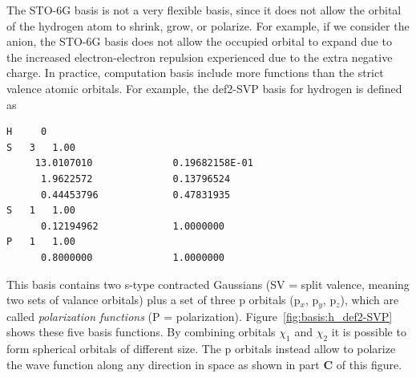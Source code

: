 \documentclass[../Main/notes.tex]{subfiles}
\begin{document}
The STO-6G basis is not a very flexible basis, since it does not allow the orbital of the hydrogen atom to shrink, grow, or polarize.
For example, if we consider the  anion, the STO-6G basis does not allow the occupied orbital to expand due to the increased electron-electron repulsion experienced due to the extra negative charge.
In practice, computation basis include more functions than the strict valence atomic orbitals.
For example, the def2-SVP basis for hydrogen is defined as
\begin{verbatim}
H     0
S   3   1.00
     13.0107010              0.19682158E-01
      1.9622572              0.13796524
      0.44453796             0.47831935
S   1   1.00
      0.12194962             1.0000000
P   1   1.00
      0.8000000              1.0000000
\end{verbatim}
This basis contains two s-type contracted Gaussians (SV = split valence, meaning two sets of valance orbitals) plus a set of three p orbitals (p$_x$, p$_y$, p$_z$), which are called \emph{polarization functions} (P = polarization).
Figure~\ref{fig:basis:h_def2-SVP} shows these five basis functions.
By combining orbitals $\chi_1$ and $\chi_2$ it is possible to form spherical orbitals of different size.
The p orbitals instead allow to polarize the wave function along any direction in space as shown in part \textbf{C} of this figure.

\end{document}
